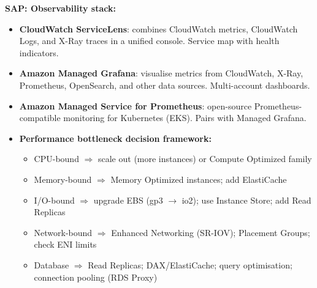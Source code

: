 \begin{sapdepth}
\textbf{SAP: Observability stack:}
\begin{itemize}
  \item \textbf{CloudWatch ServiceLens}: combines CloudWatch metrics, CloudWatch Logs, and X-Ray
        traces in a unified console. Service map with health indicators.
  \item \textbf{Amazon Managed Grafana}: visualise metrics from CloudWatch, X-Ray, Prometheus,
        OpenSearch, and other data sources. Multi-account dashboards.
  \item \textbf{Amazon Managed Service for Prometheus}: open-source Prometheus-compatible
        monitoring for Kubernetes (EKS). Pairs with Managed Grafana.
  \item \textbf{Performance bottleneck decision framework:}
    \begin{itemize}
      \item CPU-bound $\Rightarrow$ scale out (more instances) or Compute Optimized family
      \item Memory-bound $\Rightarrow$ Memory Optimized instances; add ElastiCache
      \item I/O-bound $\Rightarrow$ upgrade EBS (gp3 $\rightarrow$ io2); use Instance Store;
            add Read Replicas
      \item Network-bound $\Rightarrow$ Enhanced Networking (SR-IOV); Placement Groups;
            check ENI limits
      \item Database $\Rightarrow$ Read Replicas; DAX/ElastiCache; query optimisation;
            connection pooling (RDS Proxy)
    \end{itemize}
\end{itemize}
\end{sapdepth}
